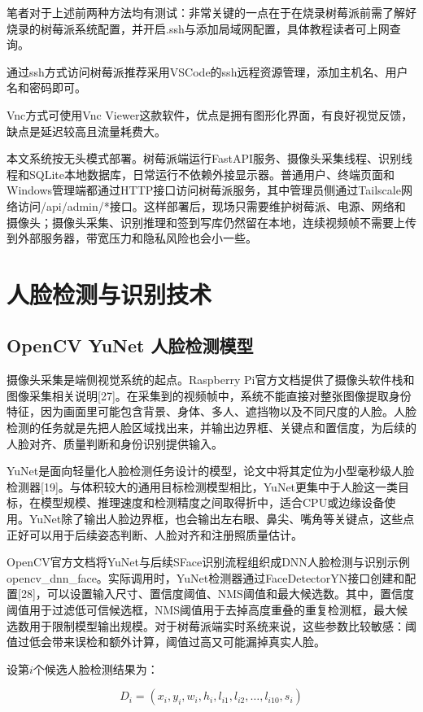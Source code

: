\documentclass[UTF8]{heuthesis}
\begin{document}
笔者对于上述前两种方法均有测试：非常关键的一点在于在烧录树莓派前需了解好烧录的树莓派系统配置，并开启.ssh与添加局域网配置，具体教程读者可上网查询。

通过ssh方式访问树莓派推荐采用VSCode的ssh远程资源管理，添加主机名、用户名和密码即可。

Vnc方式可使用Vnc Viewer这款软件，优点是拥有图形化界面，有良好视觉反馈，缺点是延迟较高且流量耗费大。

本文系统按无头模式部署。树莓派端运行FastAPI服务、摄像头采集线程、识别线程和SQLite本地数据库，日常运行不依赖外接显示器。普通用户、终端页面和Windows管理端都通过HTTP接口访问树莓派服务，其中管理员侧通过Tailscale网络访问/api/admin/*接口。这样部署后，现场只需要维护树莓派、电源、网络和摄像头；摄像头采集、识别推理和签到写库仍然留在本地，连续视频帧不需要上传到外部服务器，带宽压力和隐私风险也会小一些。

\section{人脸检测与识别技术}
\subsection{OpenCV YuNet 人脸检测模型}
摄像头采集是端侧视觉系统的起点。Raspberry Pi官方文档提供了摄像头软件栈和图像采集相关说明[27]。在采集到的视频帧中，系统不能直接对整张图像提取身份特征，因为画面里可能包含背景、身体、多人、遮挡物以及不同尺度的人脸。人脸检测的任务就是先把人脸区域找出来，并输出边界框、关键点和置信度，为后续的人脸对齐、质量判断和身份识别提供输入。

YuNet是面向轻量化人脸检测任务设计的模型，论文中将其定位为小型毫秒级人脸检测器[19]。与体积较大的通用目标检测模型相比，YuNet更集中于人脸这一类目标，在模型规模、推理速度和检测精度之间取得折中，适合CPU或边缘设备使用。YuNet除了输出人脸边界框，也会输出左右眼、鼻尖、嘴角等关键点，这些点正好可以用于后续姿态判断、人脸对齐和注册照质量估计。

OpenCV官方文档将YuNet与后续SFace识别流程组织成DNN人脸检测与识别示例opencv\_dnn\_face。实际调用时，YuNet检测器通过FaceDetectorYN接口创建和配置[28]，可以设置输入尺寸、置信度阈值、NMS阈值和最大候选数。其中，置信度阈值用于过滤低可信候选框，NMS阈值用于去掉高度重叠的重复检测框，最大候选数用于限制模型输出规模。对于树莓派端实时系统来说，这些参数比较敏感：阈值过低会带来误检和额外计算，阈值过高又可能漏掉真实人脸。

设第\(i\)个候选人脸检测结果为：

\begin{equation*}
D_i=(x_i,y_i,w_i,h_i,l_{i1},l_{i2},\ldots,l_{i10},s_i)\tag{2.1}
\end{equation*}
\end{document}
